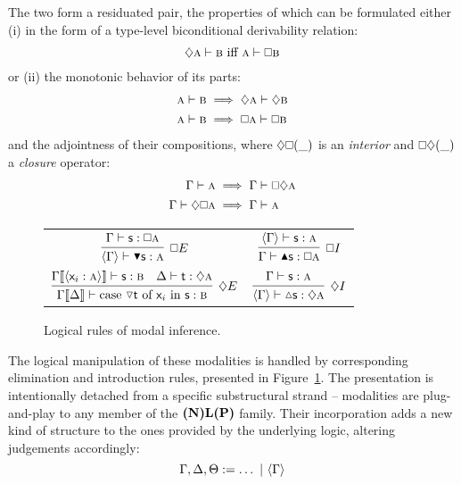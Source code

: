 The two form a residuated pair, the properties of which can be formulated either (i) in the form of a type-level biconditional derivability relation:
\begin{equation}\label{equation:db}
		\diamond \prop{a} \vdash \prop{b}\text{ iff }\prop{a} \vdash \bx\prop{b}
\end{equation}
or (ii) the monotonic behavior of its parts:
\begin{align}
		\prop{a} \vdash \prop{b} & \implies \diamond \prop{a}\vdash \diamond\prop{b}\\
		\prop{a} \vdash \prop{b} & \implies \bx{\prop{a}}\vdash \bx\prop{b}
\end{align}
and the adjointness of their compositions, where $\diamond\bx(\_)$ is an \textit{interior} and $\bx\diamond(\_)$ a \textit{closure} operator:
\begin{align}
		\Gamma \vdash \prop{a} 				& \implies \Gamma \vdash \bx\diamond\prop{a} \label{equation:closure}\\
		\Gamma \vdash \diamond\bx\prop{a} & \implies \Gamma \vdash \prop{a} \label{equation:interior}
\end{align}

\begin{figure}
	\centering
	\begin{tabularx}{0.9875\textwidth}{@{}CC@{}}
		$\infer[\bx E]{\bracket{\Gamma} \vdash \boxelim{\term{s}}: \prop{a}}{
			\Gamma \vdash \term{s}: \bx\prop{a}
		}$
		&
		$\infer[\bx I]{\Gamma \vdash \boxintro{\term{s}}:\bx\prop{a}}{
			\bracket{\Gamma} \vdash \term{s}:\prop{a}
		}$
		\\[\midsep]
		$\infer[\diamond E]{\Gamma\ctx{\Delta} \vdash \cterm{case \term{\diaelim t} of \term{\vari } in \term{s}}: \prop{b}}{
			\Gamma\ctx{\bracket{\term{\vari }:\prop{a}}}\vdash\term{s}:\prop{b}
			&
			\Delta \vdash \term{t}:\diamond\prop{a}
		}
		$
		&
		$\infer[\diamond I]{\bracket{\Gamma} \vdash \diaintro{\term{s}}: \diamond \prop{a}}{
			\Gamma \vdash \term{s}:\prop{a}
		}$
	\end{tabularx}
	\caption{Logical rules of modal inference.}
	\label{figure:modal_logical}
\end{figure}

The logical manipulation of these modalities is handled by corresponding elimination and introduction rules, presented in Figure~\ref{figure:modal_logical}.
The presentation is intentionally detached from a specific substructural strand -- modalities are plug-and-play to any member of the $\textbf{(N)L(P)}$ family.
Their incorporation adds a new kind of structure to the ones provided by the underlying logic, altering judgements accordingly:
\begin{equation}
	\Gamma, \Delta, \Theta := \dots \ | \ \bracket{\Gamma}
\end{equation}

